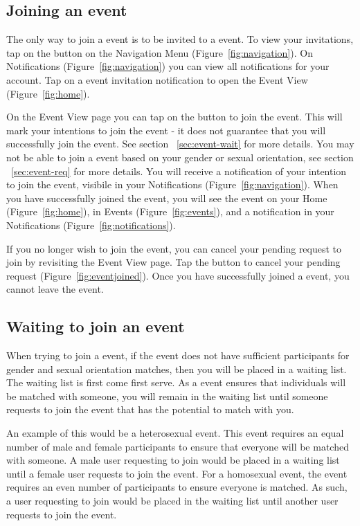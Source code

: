 \documentclass[a4paper,11pt,titlepage]{scrartcl}
\newcommand{\textui}[1]{{\fontfamily{pag}\selectfont#1}}
\newcommand{\textaction}[1]{{\fontfamily{cmtt}\selectfont#1}}
\newcommand{\Screenshot}[1]{\textui{#1}}
\newcommand{\action}[1]{\textaction{#1}}
\newcommand{\quicknav}{\Screenshot{Navigation Menu} (Figure~\ref{fig:navigation})}
\begin{document}
\subsection{Joining an event}
\label{sec:events-join}
The only way to join a event is to be invited to a event.  To view your invitations, \action{tap} on the  button on the \quicknav. On \Screenshot{Notifications} (Figure~\ref{fig:navigation}) you can view all notifications for your account.  \action{Tap} on a event invitation notification to open the \Screenshot{Event View} (Figure~\ref{fig:home}).  

On the \Screenshot{Event View} page you can tap on the  button to join the event. This will mark your intentions to join the event - it does not guarantee that you will successfully join the event. See section ~\ref{sec:event-wait} for more details.   You may not be able to join a event based on your gender or sexual orientation, see section ~\ref{sec:event-req} for more details. You will receive a notification of your intention to join the event, visibile in your \Screenshot{Notifications} (Figure~\ref{fig:navigation}).   When you have successfully joined the event, you will see the event on your \Screenshot{Home} (Figure~\ref{fig:home}), in \Screenshot{Events} (Figure~\ref{fig:events}), and a notification in your \Screenshot{Notifications} (Figure~\ref{fig:notifications}).  

If you no longer wish to join the event, you can cancel your pending request to join by revisiting the \Screenshot{Event View} page.  \action{Tap} the  button to cancel your pending request (Figure~\ref{fig:eventjoined}).  Once you have successfully joined a event, you cannot leave the event.

\subsection{Waiting to join an event}
\label{sec:events-wait}
When trying to join a event, if the event does not have sufficient participants for gender and sexual orientation matches, then you will be placed in a waiting list.  The waiting list is first come first serve.  As a event ensures that individuals will be matched with someone, you will remain in the waiting list until someone requests to join the event that has the potential to match with you. 

An example of this would be a heterosexual event.  This event requires an equal number of male and female participants to ensure that everyone will be matched with someone.  A male user requesting to join would be placed in a waiting list until a female user requests to join the event.  For a homosexual event, the event requires an even number of participants to ensure everyone is matched.  As such, a user requesting to join would be placed in the waiting list until another user requests to join the event.
\end{document}
